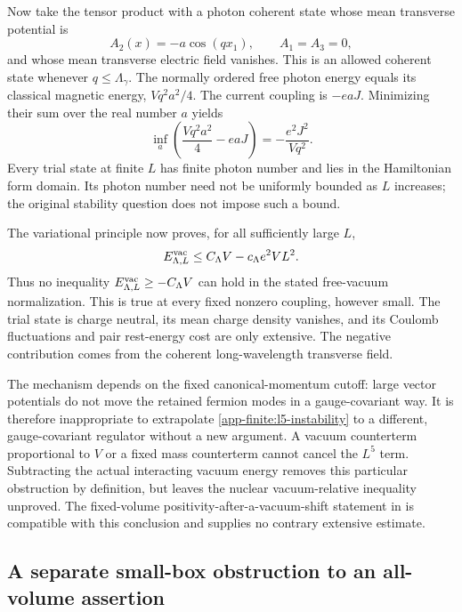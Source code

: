 Now take the tensor product with a photon coherent state whose mean transverse
potential is
\[
 A_2(x)=-a\cos(qx_1),\qquad A_1=A_3=0,
\]
and whose mean transverse electric field vanishes.  This is an allowed
coherent state whenever $q\le\Lambda_\gamma$.  The normally ordered free
photon energy equals its classical magnetic energy,
$Vq^2a^2/4$.  The current coupling is $-eaJ$.  Minimizing their sum over the
real number $a$ yields
\begin{equation}
 \inf_a\left(\frac{Vq^2a^2}{4}-eaJ\right)
 =-\frac{e^2J^2}{Vq^2}.
 \label{app-finite:coherent-minimum}
\end{equation}
Every trial state at finite $L$ has finite photon number and lies in the
Hamiltonian form domain.  Its photon number need not be uniformly bounded as
$L$ increases; the original stability question does not impose such a bound.

The variational principle now proves, for all sufficiently large $L$,
\begin{equation}
 E^{\rm vac}_{\Lambda,L}
 \le C_\Lambda V-c_\Lambda e^2VL^2.
 \label{app-finite:l5-instability}
\end{equation}
Thus no inequality $E^{\rm vac}_{\Lambda,L}\ge-C_\Lambda V$ can hold in the
stated free-vacuum normalization.  This is true at every fixed nonzero
coupling, however small.  The trial state is charge neutral, its mean charge
density vanishes, and its Coulomb fluctuations and pair rest-energy cost are
only extensive.  The negative contribution comes from the coherent
long-wavelength transverse field.

The mechanism depends on the fixed canonical-momentum cutoff: large vector
potentials do not move the retained fermion modes in a gauge-covariant way.
It is therefore inappropriate to extrapolate
\eqref{app-finite:l5-instability} to a different, gauge-covariant regulator
without a new argument.  A vacuum counterterm proportional to $V$ or a fixed
mass counterterm cannot cancel the $L^5$ term.  Subtracting the actual
interacting vacuum energy removes this particular obstruction by definition,
but leaves the nuclear vacuum-relative inequality unproved.  The fixed-volume
positivity-after-a-vacuum-shift statement in \cite{JW2018} is compatible with
this conclusion and supplies no contrary extensive estimate.

\subsection{A separate small-box obstruction to an all-volume assertion}
\label{app-finite:small-box}

